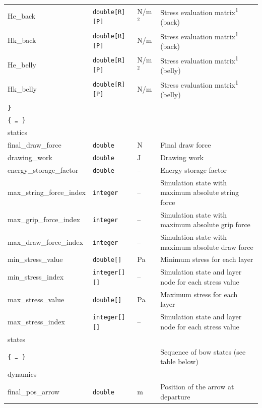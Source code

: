 \documentclass[12pt]{article}
\begin{document}
\begin{table}[H]
{\begin{tabular}{ l | l | l | l }
\quad\quad\quad\quad He\_back & \texttt{double[R][P]} & \unit[]{N/m$^2$} & Stress evaluation matrix\textsuperscript{1} (back) \\
\quad\quad\quad\quad Hk\_back & \texttt{double[R][P]} & \unit[]{N/m} & Stress evaluation matrix\textsuperscript{1} (back) \\
\quad\quad\quad\quad He\_belly & \texttt{double[R][P]} & \unit[]{N/m$^2$} & Stress evaluation matrix\textsuperscript{1} (belly) \\
\quad\quad\quad\quad Hk\_belly & \texttt{double[R][P]} & \unit[]{N/m} & Stress evaluation matrix\textsuperscript{1} (belly) \\
\quad\quad\quad \texttt{\}} & & & \\
\quad\quad\quad \texttt{\{\ \ldots\ \}} & & & \\
\tablespace statics & & & \\
\quad final\_draw\_force & \texttt{double} & \unit[]{N} & Final draw force \\
\quad drawing\_work & \texttt{double} & \unit[]{J} & Drawing work \\
\quad energy\_storage\_factor & \texttt{double} & -- & Energy storage factor \\
\quad max\_string\_force\_index & \texttt{integer} & -- & Simulation state with maximum absolute string force \\
\quad max\_grip\_force\_index & \texttt{integer} & -- & Simulation state with maximum absolute grip force \\
\quad max\_draw\_force\_index  & \texttt{integer} & -- & Simulation state with maximum absolute draw force \\
\quad min\_stress\_value & \texttt{double[]} & \unit[]{Pa} & Minimum stress for each layer \\
\quad min\_stress\_index & \texttt{integer[][]} & -- & Simulation state and layer node for each stress value \\
\quad max\_stress\_value & \texttt{double[]} & \unit[]{Pa} & Maximum stress for each layer \\
\quad max\_stress\_index & \texttt{integer[][]} & -- & Simulation state and layer node for each stress value \\
\quad states & & & \\
\quad\quad \texttt{\{\ \ldots\ \}} & & & Sequence of bow states (see table below) \\
\tablespace dynamics & & & \\
\quad final\_pos\_arrow & \texttt{double} & \unit[]{m} & Position of the arrow at departure\\

\end{tabular}}
\end{table}
\end{document}
